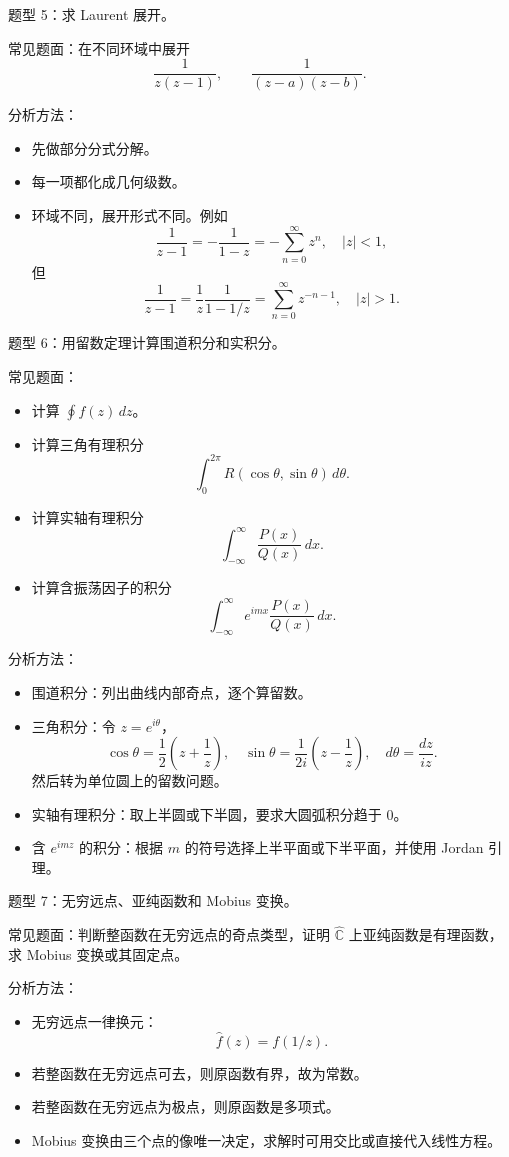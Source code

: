 \documentclass{article}
\begin{document}
题型 5：求 Laurent 展开。

常见题面：在不同环域中展开 \[
\frac{1}{z(z-1)},\qquad \frac{1}{(z-a)(z-b)}.
\]

分析方法：

\begin{itemize}
\item
  先做部分分式分解。
\item
  每一项都化成几何级数。
\item
  环域不同，展开形式不同。例如 \[
  \frac{1}{z-1}=-\frac1{1-z}=-\sum_{n=0}^\infty z^n,\quad |z|<1,
  \] 但 \[
  \frac{1}{z-1}=\frac1z\frac1{1-1/z}
  =\sum_{n=0}^{\infty}z^{-n-1},\quad |z|>1.
  \]
\end{itemize}

题型 6：用留数定理计算围道积分和实积分。

常见题面：

\begin{itemize}
\item
  计算 \(\oint f(z)\,dz\)。
\item
  计算三角有理积分 \[
  \int_0^{2\pi} R(\cos\theta,\sin\theta)\,d\theta.
  \]
\item
  计算实轴有理积分 \[
  \int_{-\infty}^{\infty}\frac{P(x)}{Q(x)}\,dx.
  \]
\item
  计算含振荡因子的积分 \[
  \int_{-\infty}^{\infty}e^{imx}\frac{P(x)}{Q(x)}\,dx.
  \]
\end{itemize}

分析方法：

\begin{itemize}
\item
  围道积分：列出曲线内部奇点，逐个算留数。
\item
  三角积分：令 \(z=e^{i\theta}\)， \[
  \cos\theta=\frac12\left(z+\frac1z\right),\quad
  \sin\theta=\frac1{2i}\left(z-\frac1z\right),\quad
  d\theta=\frac{dz}{iz}.
  \] 然后转为单位圆上的留数问题。
\item
  实轴有理积分：取上半圆或下半圆，要求大圆弧积分趋于 $0$。
\item
  含 \(e^{imz}\) 的积分：根据 \(m\)
  的符号选择上半平面或下半平面，并使用 Jordan 引理。
\end{itemize}

题型 7：无穷远点、亚纯函数和 Mobius 变换。

常见题面：判断整函数在无穷远点的奇点类型，证明
\(\widehat{\mathbb C}\) 上亚纯函数是有理函数，求 Mobius
变换或其固定点。

分析方法：

\begin{itemize}
\item
  无穷远点一律换元： \[
  \hat f(z)=f(1/z).
  \]
\item
  若整函数在无穷远点可去，则原函数有界，故为常数。
\item
  若整函数在无穷远点为极点，则原函数是多项式。
\item
  Mobius 变换由三个点的像唯一决定，求解时可用交比或直接代入线性方程。
\end{itemize}
\end{document}
